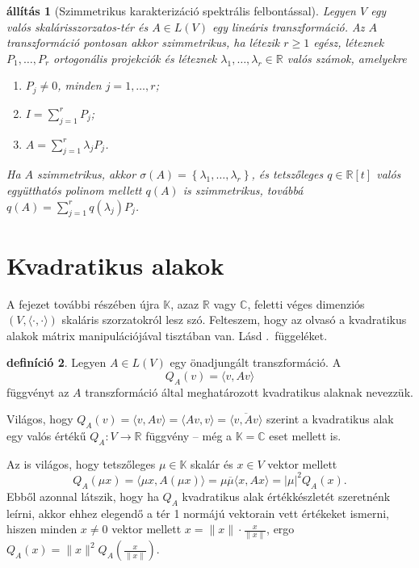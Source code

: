 \documentclass[a4paper, showtrims]{memoir}
\theoremstyle{plain}
\newtheorem{proposition}{állítás}[chapter]
\theoremstyle{remark}
\theoremstyle{definition}
\newtheorem{definition}[proposition]{definíció}
\newcommand{\ip}[2]{\langle#1,#2\rangle}
\begin{document}
\begin{proposition}[Szimmetrikus karakterizáció spektrális felbontással]
	Legyen $V$ egy valós ska\-lá\-ris\-szor\-za\-tos-tér
	és $A\in L\left( V \right)$ egy lineáris transzformáció.
	Az $A$ transzformáció pontosan akkor szimmetrikus,
	ha létezik $r\geq 1$ egész, léteznek $P_1,\ldots,P_r$ ortogonális projekciók és
	léteznek $\lambda_1,\ldots,\lambda_r\in\mathbb{R}$ valós számok,
	amelyekre
	\begin{enumerate}
		\item $P_j\neq 0$, minden $j=1,\ldots,r$;
		\item $I=\sum_{j=1}^rP_j$;
		\item $A=\sum_{j=1}^r\lambda_jP_j$.
	\end{enumerate}
	Ha $A$ szimmetrikus,
	akkor $\sigma\left( A \right)=\left\{ \lambda_1,\ldots,\lambda_r \right\}$,
	és tetszőleges $q\in\mathbb{R}[t]$ valós együtthatós polinom mellett
	$q\left( A \right)$ is szimmetrikus,
	továbbá
	$q\left( A \right)=\sum_{j=1}^rq\left( \lambda_j \right)P_j$.
\end{proposition}


\section{Kvadratikus alakok}
A fejezet további részében újra $\mathbb{K}$, azaz $\mathbb{R}$ vagy $\mathbb{C}$, 
feletti véges dimenziós $\left( V,\ip{\cdot}{\cdot} \right)$ skaláris szorzatokról lesz szó.
Felteszem, hogy az olvasó a kvadratikus alakok mátrix manipulációjával tisztában van.
Lásd .~függeléket.
\begin{definition}
    Legyen $A\in L\left( V \right)$ egy önadjungált transzformáció.
    A
    \[
        Q_A\left( v \right)
        =
        \ip{v}{Av}
    \]
    függvényt az $A$ transzformáció által meghatározott kvadratikus alaknak nevezzük.

    Világos, hogy
    $Q_A\left( v \right)=\ip{v}{Av}=\ip{Av}{v}=\overline{\ip{v}{Av}}$
    szerint a kvadratikus alak egy valós értékű $Q_A:V\to\mathbb{R}$ függvény
    -- még a $\mathbb{K}=\mathbb{C}$ eset mellett is.
\end{definition}

Az is világos, hogy tetszőleges $\mu\in\mathbb{K}$ skalár és $x\in V$ vektor mellett
\[
    Q_A(\mu x)=\ip{\mu x}{A\left( \mu x \right)}=\mu\overline{\mu}\ip{x}{Ax}=|\mu|^2Q_A(x).
\]
Ebből azonnal látszik, hogy ha $Q_A$ kvadratikus alak értékkészletét szeretnénk leírni,
akkor ehhez elegendő a tér 1 normájú vektorain vett értékeket ismerni,
hiszen minden $x\neq 0$ vektor mellett $x=\|x\|\cdot\frac{x}{\|x\|}$,
ergo $Q_A\left( x \right)=\|x\|^2Q_A\left( \frac{x}{\|x\|} \right)$.
\end{document}
